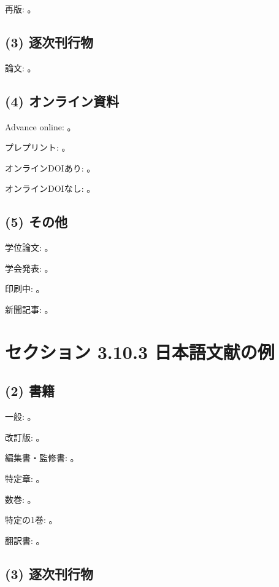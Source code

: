 \documentclass[a4paper]{jlreq}
\begin{document}
再版: \textcite{Adler1970}。

\subsection{(3) 逐次刊行物}

論文: \textcite{Takahashi2017}。

\subsection{(4) オンライン資料}

Advance online: \textcite{Yokoyama2020}。

プレプリント: \textcite{Yoshimura2020}。

オンラインDOIあり: \textcite{Katahira2020}。

オンラインDOIなし: \textcite{Abrams2020}。

\subsection{(5) その他}

学位論文: \textcite{Tsukamoto2015}。

学会発表: \textcite{Oe2016}。

印刷中: \textcite{OSeaghdha2024}。

新聞記事: \textcite{Uematsu2015}。


\section{セクション 3.10.3 日本語文献の例}

\subsection{(2) 書籍}

一般: \textcite{Ichikawa2016}。

改訂版: \textcite{Hasegawa2020}。

編集書・監修書: \textcite{Hori2009}。

特定章: \textcite{Naito2018}。

数巻: \textcite{Nojima2018}。

特定の1巻: \textcite{Asano2020}。

翻訳書: \textcite{LopezCorvo2014ja}。

\subsection{(3) 逐次刊行物}
\end{document}
